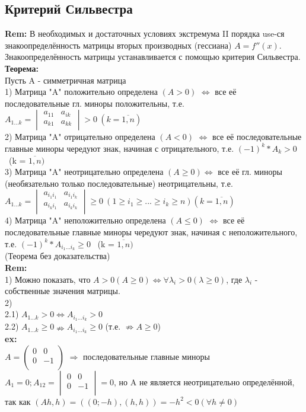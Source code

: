 \subsection{Критерий Сильвестра}
\textbf{Rem:} В необходимых и достаточных условиях экстремума II порядка use-ся знакоопределённость матрицы вторых производных (гессиана) $A=f''(x)$.\\
Знакоопределённость матрицы устанавливается с помощью критерия Сильвестра.\\
\textbf{Теорема:}\\
Пусть A - симметричная матрица\\
1) Матрица "A" положительно определена $(A>0)$ $\Leftrightarrow$ все её последовательные гл. миноры положительны, т.е. $A_{1...k} = \begin{vmatrix}
a_{11} & a_{ik} \\
a_{k1} & a_{kk}\\
\end{vmatrix} >0 \ (k = \overline{1,n})
$ \\
2) Матрица "A" отрицательно определена $(A<0)$ $\Leftrightarrow$ все её последовательные главные миноры чередуют знак, начиная с отрицательного, т.е. $(-1)^k*A_k >0 $ \ (k = $\overline{1,n} )$ \\
3) Матрица "A" неотрицательно определена $(A\geq 0) \Leftrightarrow$ все её гл. миноры (необязательно только последовательные) неотрицательны, т.е. $A_{1...k} = \begin{vmatrix}
a_{i_1 i_1} & a_{i_1 i_k} \\
a_{i_k i_1} & a_{i_k i_k}\\
\end{vmatrix} \geq 0 \ (1 \geq i_1 \geq ... \geq i_k \geq n) (k = \overline{1,n})
$ \\
4) Матрица "A" неположительно определена $(A\leq 0)$ $\Leftrightarrow$ все её последовательные главные миноры чередуют знак, начиная с неположительного, т.е. $(-1)^k*A_{i_1...i_k} \geq 0 $ \ (k = $\overline{1,n} )$ \\ 
(Теорема без доказательства)\\
\textbf{Rem:} \\
1) Можно показать, что $A>0(A \geq 0) \Leftrightarrow \forall \lambda_i >0 (\lambda \geq 0)$, где $\lambda_i$ - собственные значения матрицы. \\
2)\\
2.1) $A_{1...k} > 0 \Leftrightarrow A_{i_1...i_k} > 0$ \\
2.2) $A_{1...k} \geq 0 \nRightarrow A_{i_1...i_k} \geq 0$ (т.е. $\nRightarrow A \geq 0$) \\
\textbf{ex:} \\
$
A = \begin{pmatrix}
0 & 0 \\
0 & -1 \\
\end{pmatrix} 
$
$\Rightarrow$ последовательные главные миноры $A_1=0; A_{12}=
\begin{vmatrix}
0 & 0 \\
0 & -1\\
\end{vmatrix}=0
$, но A не является неотрицательно определённой, так как $(Ah, h)=((0;-h),(h,h)) = -h^2<0 (\forall h \neq 0)$

